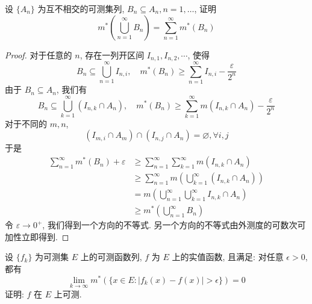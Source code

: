 \documentclass[../main.tex]{subfiles}
\begin{document}
\begin{exercise}{}{}
设 $\{A_n\}$ 为互不相交的可测集列, $B_n \subseteq A_n, n=1, \dots$, 证明
\[
    m^*\left(\bigcup_{n=1}^\infty B_n\right) = \sum_{n=1}^\infty m^*(B_n)
\]
\end{exercise}
\begin{proof}
    
   对于任意的 \(  n  \), 存在一列开区间 \(  I_{n,1},I_{n,2},\cdots   \), 使得 \[
   B_{n}\subseteq \bigcup _{n = 1}^{\infty}I_{n,i},\quad  m^{*}\left( B_{n} \right)\ge \sum _{n = 1}^{\infty}I_{n,i}- \frac{ \varepsilon  }{2^{n} }  
   \]  由于 \(  B_{n}\subseteq A_{n}  \), 我们有 \[
   B_{n}\subseteq \bigcup _{k = 1}^{\infty}\left( I_{n,k}\cap A_{n} \right),\quad m^{*}\left( B_{n} \right)\ge \sum _{k = 1}^{\infty}m\left( I_{n,k}\cap A_{n} \right)-\frac{ \varepsilon  }{2^{n} }    
   \]  对于不同的 \(  m,n  \), \[
   \left( I_{m,i}\cap A_{m} \right)\cap \left( I_{n,j}\cap A_{n} \right) = \varnothing ,\forall i,j 
   \] 于是 \[
 \begin{aligned}
  \sum _{n = 1}^{\infty}m^{*}\left( B_{n} \right)+  \varepsilon &\ge   \sum _{n = 1}^{\infty}\sum _{k= 1}^{\infty}m\left( I_{n,k}\cap A_{n} \right)\\ 
   &\ge \sum _{n = 1}^{\infty}m\left( \bigcup _{k= 1}^{\infty}\left( I_{n,k}\cap A_{n} \right)  \right)   \\ 
    &= m\left( \bigcup _{n = 1}^{\infty}\bigcup _{k= 1}^{\infty}I_{n,k}\cap A_{n} \right)\\ 
     &\ge m^{*}\left( \bigcup _{n = 1}^{\infty}B_{n} \right)  
 \end{aligned} 
   \]令 \(   \varepsilon\to 0^{+ }  \), 我们得到一个方向的不等式. 另一个方向的不等式由外测度的可数次可加性立即得到. 
\end{proof}
\begin{exercise}{}{}
设 $\{f_k\}$ 为可测集 $E$ 上的可测函数列, $f$ 为 $E$ 上的实值函数, 且满足: 对任意 $\epsilon > 0$, 都有
\[
    \lim_{k\to\infty} m^*(\{x \in E : |f_k(x) - f(x)| > \epsilon\}) = 0
\]
证明: $f$ 在 $E$ 上可测.
\end{exercise}
\end{document}
